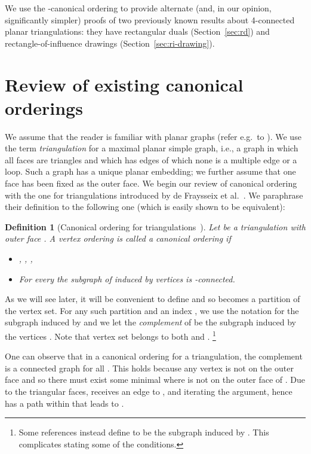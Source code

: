 \documentclass[12pt]{article}
\newtheorem{definition}{Definition}
\begin{document}
We use the -canonical ordering to provide alternate (and, in our opinion, significantly simpler) proofs of two previously known results about 4-connected planar triangulations: they have rectangular duals (Section~\ref{sec:rd}) and rectangle-of-influence drawings (Section~\ref{sec:ri-drawing}). 


\section{Review of existing canonical orderings}

We assume that the reader is familiar with planar graphs (refer e.g.~to \cite{Die12}).  We use the
term {\em triangulation} for a maximal planar simple graph, i.e., a graph in which all faces
are triangles and which has  edges of which none is a multiple edge or a loop.  Such a graph has a unique planar embedding; we further
assume that one face has been fixed as the outer face.
We begin our review of canonical ordering with the
one for triangulations introduced by de Fraysseix et al.~\cite{FPP90}. 
We paraphrase their definition to the following one (which is easily shown to be equivalent):

\begin{definition}[Canonical ordering for triangulations~\cite{FPP90}]
\label{def:triangulated-co}
Let  be a triangulation with outer face . A vertex ordering
 is called a \emph{canonical ordering} if 
\begin{itemize}
\item , , ,
\item For every 
the subgraph  of  induced by vertices  is -connected. 
\end{itemize}
\end{definition}

As we will see later, it will be convenient to define  and so  becomes a partition
of the vertex set.  For any such partition and an index , we use the notation  for the subgraph induced by 
 and we let the {\em complement}
 of  be the subgraph induced by the vertices . 
Note that vertex set  belongs to both  and .
\footnote{Some references instead define  to be the subgraph induced by
.  This complicates stating some of the conditions.}  

One can observe that in a canonical ordering for a triangulation, the complement  is a connected graph for all . 
This holds because any vertex  is not on the outer face and so there must exist some minimal  where  is
not on the outer face of .  Due to the triangular faces,  receives an edge to , and iterating the
argument, hence has a path within  that leads to .
\end{document}

